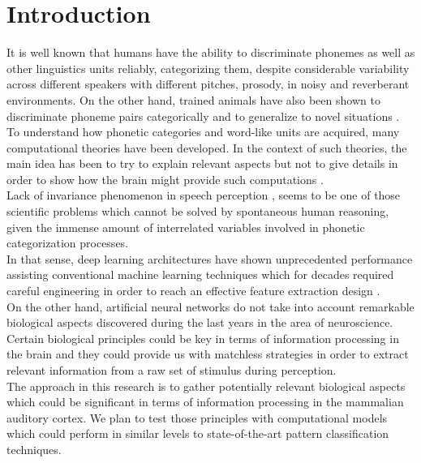 \documentclass[11pt,a4paper]{article}
\begin{document}
\section{Introduction}

It is well known that humans have the ability to discriminate phonemes
as well as other linguistics units reliably, categorizing them,
despite considerable variability across different speakers
with different pitches, prosody, in noisy and reverberant
environments.
On the other hand, trained animals have also been shown to discriminate phoneme
pairs categorically and to generalize to novel situations
\cite{kuhl_1975, kuhl_1983, kluender_1998, pons_2006, hienz_1996, dent_1997, lotto_1997}. \\

To understand how phonetic categories and word-like units
are acquired, many computational theories have been developed.
In the context of such theories, the main idea has
been to try to explain relevant aspects but
not to give details
in order to show how the brain might provide such
computations \cite{rasanen_2012}. \\

Lack of invariance phenomenon in speech perception
\cite{appelbaum_1996},
seems to be one of those scientific problems which
cannot be solved by spontaneous human reasoning,
given the immense amount of interrelated variables
involved in phonetic categorization processes. \\

In that sense, deep learning architectures have shown
unprecedented performance assisting
conventional machine learning techniques which for decades 
required careful engineering
in order to reach an effective feature extraction design
\cite{lecun_2015}. \\

On the other hand, artificial neural networks do not take into account
remarkable biological aspects discovered during the last years
in the area of neuroscience.
Certain biological principles could be key in terms of
information processing in the brain and they could
provide us with matchless strategies in order to extract
relevant information from a raw set of stimulus
during perception. \\

The approach in this research is to gather
potentially relevant biological aspects which could be
significant in terms of information processing
in the mammalian auditory cortex. We plan to test those principles
with computational models which could
perform in similar levels to state-of-the-art pattern classification techniques. \\
\end{document}
